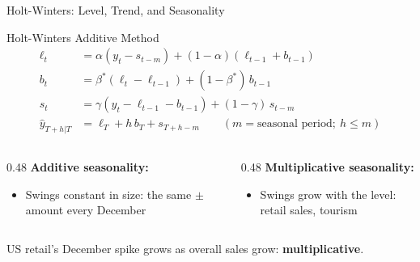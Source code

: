 \documentclass[aspectratio=169, 11pt]{beamer}
\begin{document}
\begin{frame}{Holt-Winters: Level, Trend, and Seasonality}
  \begin{definitionbox}{Holt-Winters Additive Method \parencite{Winters1960}}
    {\small
    \vspace{-0.1cm}
    \[
    \begin{aligned}
      \ell_t &= \alpha(y_t - s_{t-m}) + (1-\alpha)(\ell_{t-1}+b_{t-1}) \\[-1pt]
      b_t &= \beta^*(\ell_t - \ell_{t-1}) + (1-\beta^*)\,b_{t-1} \\[-1pt]
      s_t &= \gamma(y_t - \ell_{t-1} - b_{t-1}) + (1-\gamma)\,s_{t-m} \\[-1pt]
      \hat{y}_{T+h|T} &= \ell_T + h\,b_T + s_{T+h-m}
      \qquad (m = \text{seasonal period};\ h \le m)
    \end{aligned}
    \]
    \vspace{-0.4cm}
    }
  \end{definitionbox}
  \begin{columns}[T]
    \begin{column}{0.48\textwidth}
      \textbf{Additive seasonality:}
      \begin{itemize}\small\itemsep0pt
        \item Swings constant in size: the same $\pm$ amount every December
      \end{itemize}
    \end{column}
    \begin{column}{0.48\textwidth}
      \textbf{Multiplicative seasonality:}
      \begin{itemize}\small\itemsep0pt
        \item Swings grow with the level: retail sales, tourism
      \end{itemize}
    \end{column}
  \end{columns}
  \vspace{0.2cm}
  US retail's December spike grows as overall sales grow: \textbf{multiplicative}.

\end{frame}
\end{document}
